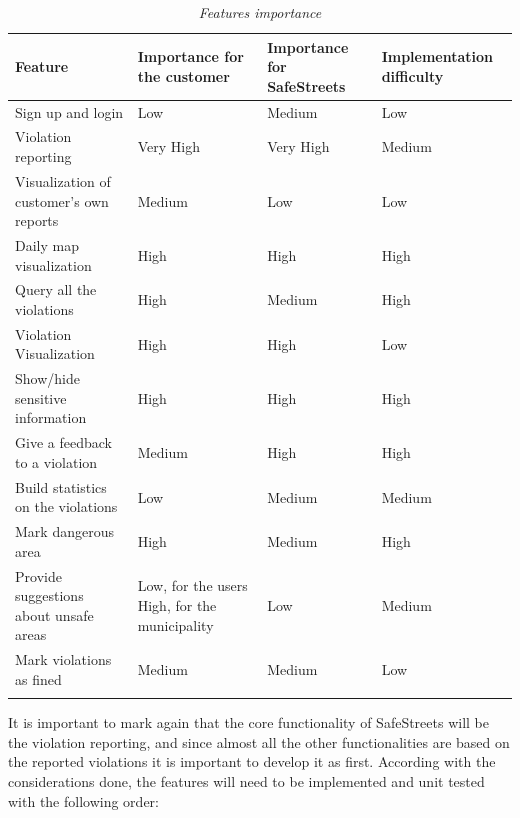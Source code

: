\documentclass[../RASD.tex]{subfiles}
\begin{document}
    \begin{center}
        \begin{longtable}{| p{.25\linewidth} | p{.25\linewidth} | p{.25\linewidth} | p{.25\linewidth} |}

            \hline
            \textbf{Feature} & \textbf{Importance for the customer} & \textbf{Importance for SafeStreets} & \textbf{Implementation difficulty} \\ \hline
            Sign up and login & Low & Medium & Low\\ \hline
            Violation reporting & Very High & Very High & Medium\\ \hline
            Visualization of customer’s own reports & Medium & Low & Low\\ \hline
            Daily map visualization & High & High & High\\ \hline
            Query all the violations & High & Medium & High\\ \hline
            Violation Visualization & High & High & Low\\ \hline
            Show/hide sensitive information & High & High & High\\ \hline
            Give a feedback to a violation & Medium & High & High\\ \hline
            Build statistics on the violations & Low & Medium & Medium\\ \hline
            Mark dangerous area & High & Medium & High\\ \hline
            Provide suggestions about unsafe areas & Low, for the users High, for the municipality & Low & Medium\\ \hline
            Mark violations as fined & Medium & Medium & Low\\ \hline
            \caption[\textit{Features importance}]{\textit{Features importance}}
        \end{longtable}
    \end{center}
    It is important to mark again that the core functionality of SafeStreets will be the violation reporting,
    and since almost all the other functionalities are based on the reported violations it is important to develop it as first.
    According with the considerations done, the features will need to be implemented and unit tested with the following order:
\end{document}
